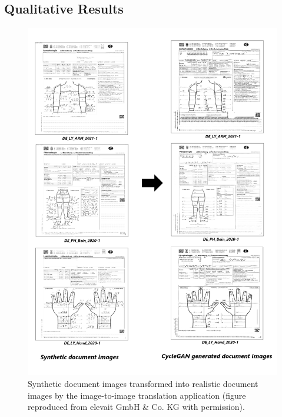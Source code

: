 \subsection{Qualitative Results}\label{QualitativeResults}


\begin{figure}[H]
        \begin{center}
	    \includegraphics[scale=0.30]{images/Evaluation/Qualitative_Results.png}
	    \caption[Synthetic document images transformed into realistic document images by the image-to-image translation application.]{Synthetic document images transformed into realistic document images by the image-to-image translation application (figure reproduced from elevait GmbH \& Co. KG with permission).}
	    \label{fig:QualitativeResults}
	    \end{center}
\end{figure}


